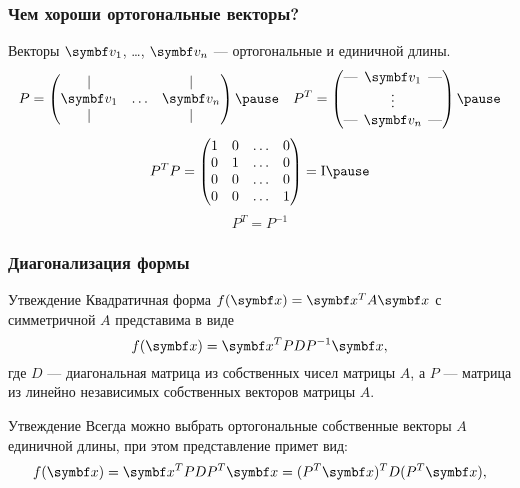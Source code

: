 \begin{frame}
    \frametitle{Чем хороши ортогональные векторы?}

    Векторы $\bv_1$, \ldots, $\bv_n$ — ортогональные и единичной длины.
    \[
    P = \begin{pmatrix}
        \vert &  & \vert \\
        \bv_1 & \ldots & \bv_n \\
        \vert &  & \vert \\
    \end{pmatrix}    \pause \quad
    P^T = \begin{pmatrix}
\text{---} \hspace{-0.2cm} & \bv_1 & \hspace{-0.2cm} \text{---} \\
 & \vdots &  \\
\text{---} \hspace{-0.2cm} & \bv_n & \hspace{-0.2cm} \text{---} \\
        \end{pmatrix}    \pause
    \]
%
    \[
    P^T P = \begin{pmatrix}        
        1 & 0 & \ldots & 0 \\
        0 & 1 & \ldots & 0 \\
        0 & 0 & \ldots & 0 \\
        0 & 0 & \ldots & 1 \\
    \end{pmatrix}  = \Id   \pause
    \]
%
    \[
    P^T = P^{-1}    
    \]
    
\end{frame}

\begin{frame}
    \frametitle{Диагонализация формы}

    \begin{block}{Утвеждение}
        Квадратичная форма $f(\bx) = \bx^T A \bx$ с симметричной $A$ представима в виде
        \[
        f(\bx) = \bx^T PDP^{-1} \bx,    
        \] 
        где $D$ — диагональная матрица из собственных чисел матрицы $A$, 
        а $P$ — матрица из линейно независимых собственных векторов матрицы $A$.
    \end{block}
    \pause
\begin{block}{Утвеждение}
    Всегда можно выбрать ортогональные собственные векторы $A$ единичной длины, 
    при этом представление примет вид:
    \[
    f(\bx) = \bx^T PDP^T \bx = (P^T \bx)^T D (P^T \bx),    
    \] 
\end{block}
    
\end{frame}


